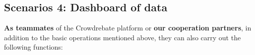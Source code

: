 \subsection{Scenarios 4: Dashboard of data}

\textbf{As teammates} of the Crowdrebate platform or \textbf{our cooperation partners}, in addition to the basic operations mentioned above, they can also carry out the following functions:

\begin{figure}[t!] \vspace{-1.5ex}
\end{figure}
